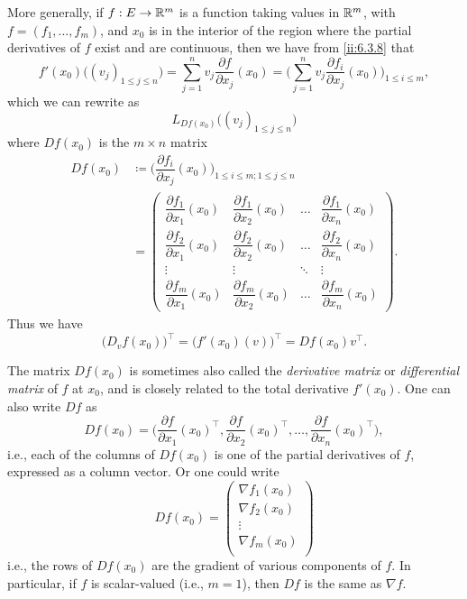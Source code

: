 \begin{ac}\label{ii:ac:6.3.4}
  More generally, if \(f : E \to \mathbb{R}^m\) is a function taking values in \(\mathbb{R}^m\), with \(f = (f_1, \dots, f_m)\), and \(x_0\) is in the interior of the region where the partial derivatives of \(f\) exist and are continuous, then we have from \cref{ii:6.3.8} that
  \[
    f'(x_0)\big((v_j)_{1 \leq j \leq n}\big) = \sum_{j = 1}^n v_j \dfrac{\partial f}{\partial x_j}(x_0) = \bigg(\sum_{j = 1}^n v_j \dfrac{\partial f_i}{\partial x_j}(x_0)\bigg)_{1 \leq i \leq m},
  \]
  which we can rewrite as
  \[
    L_{D f(x_0)}\big((v_j)_{1 \leq j \leq n}\big)
  \]
  where \(D f(x_0)\) is the \(m \times n\) matrix
  \begin{align*}
    D f(x_0) & \coloneqq \bigg(\dfrac{\partial f_i}{\partial x_j}(x_0)\bigg)_{1 \leq i \leq m ; 1 \leq j \leq n}                                      \\
             & = \begin{pmatrix}
                   \dfrac{\partial f_1}{\partial x_1}(x_0) & \dfrac{\partial f_1}{\partial x_2}(x_0) & \dots  & \dfrac{\partial f_1}{\partial x_n}(x_0) \\
                   \dfrac{\partial f_2}{\partial x_1}(x_0) & \dfrac{\partial f_2}{\partial x_2}(x_0) & \dots  & \dfrac{\partial f_2}{\partial x_n}(x_0) \\
                   \vdots                                  & \vdots                                  & \ddots & \vdots                                  \\
                   \dfrac{\partial f_m}{\partial x_1}(x_0) & \dfrac{\partial f_m}{\partial x_2}(x_0) & \dots  & \dfrac{\partial f_m}{\partial x_n}(x_0)
                 \end{pmatrix}.
  \end{align*}
  Thus we have
  \[
    \big(D_v f(x_0)\big)^\top = \big(f'(x_0)(v)\big)^\top = D f(x_0) v^\top.
  \]

  The matrix \(D f(x_0)\) is sometimes also called the \emph{derivative matrix} or \emph{differential matrix} of \(f\) at \(x_0\), and is closely related to the total derivative \(f'(x_0)\).
  One can also write \(Df\) as
  \[
    D f(x_0) = \bigg(\dfrac{\partial f}{\partial x_1}(x_0)^\top, \dfrac{\partial f}{\partial x_2}(x_0)^\top, \dots, \dfrac{\partial f}{\partial x_n}(x_0)^\top\bigg),
  \]
  i.e., each of the columns of \(D f(x_0)\) is one of the partial derivatives of \(f\), expressed as a column vector.
  Or one could write
  \[
    D f(x_0) = \begin{pmatrix}
      \nabla f_1(x_0) \\
      \nabla f_2(x_0) \\
      \vdots          \\
      \nabla f_m(x_0) \\
    \end{pmatrix}
  \]
  i.e., the rows of \(D f(x_0)\) are the gradient of various components of \(f\).
  In particular, if \(f\) is scalar-valued (i.e., \(m = 1\)), then \(Df\) is the same as \(\nabla f\).
\end{ac}

